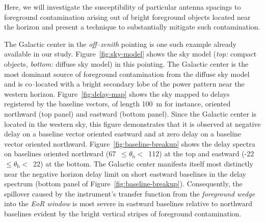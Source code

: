 \documentclass[preprint2,iop,numberedappendix]{emulateapj}
\begin{document}

Here, we will investigate the susceptibility of particular antenna spacings to foreground contamination arising out of bright foreground objects located near the horizon and present a technique to substantially mitigate such contamination.

The Galactic center in the {\it off--zenith} pointing is one such example already available in our study. Figure~\ref{fig:sky-model} shows the sky model ({\it top:} compact objects, {\it bottom:} diffuse sky model) in this pointing. The Galactic center is the most dominant source of foreground contamination from the diffuse sky model and is co--located with a bright secondary lobe of the power pattern near the western horizon. Figure~\ref{fig:delay-map} shows the sky mapped to delays registered by the baseline vectors, of length 100~m for instance, oriented northward (top panel) and eastward (bottom panel). Since the Galactic center is located in the western sky, this figure demonstrates that it is observed at negative delay on a baseline vector oriented eastward and at zero delay on a baseline vector oriented northward. Figure~\ref{fig:baseline-breakup} shows the delay spectra on baselines oriented northward (67~$\le \theta_\textrm{b} <$~112) at the top and eastward (-22~$\le \theta_\textrm{b} <$~22) at the bottom. The Galactic center manifests itself most distinctly near the negative horizon delay limit on short eastward baselines in the delay spectrum (bottom panel of Figure~\ref{fig:baseline-breakup}). Consequently, the spillover caused by the instrument's transfer function from the {\it foreground wedge} into the {\it EoR window} is most severe in eastward baselines relative to northward baselines evident by the bright vertical stripes of foreground contamination. 
\end{document}

